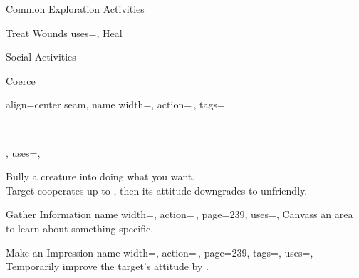 \begin{PageFront}
\begin{Tables}{\frontTableHeight}
\begin{Table}{Common Exploration Activities}
\begin{entry}{Treat Wounds}
{                uses=\Medicine,
            }
                Heal  \hfill
                 \hfill
                \\\hfill
                \Ts\DC[15] \quad
                \E\DC[20] \quad
                \M\DC[30]  \quad
                \Le\DC[40] \hfill
            \end{entry}
        \end{Table}
        \TableSpace
        \begin{Table}{Social Activities}
            \begin{entry}{Coerce}{%
                align=center seam,
                name width=\activityLength,%
                action=\,,
                tags=\parbox{0.5\linewidth}{\raggedleft{}\,\Concentrate\\\Auditory\Linguistic},
                uses=\InitimidationWill,
            }
                Bully a creature into doing what you want.\\
                Target cooperates up to , then its attitude downgrades to unfriendly. \hfill
                \\
                \hfill
            \end{entry}
            \begin{entry}{Gather Information}{%
                name width=\activityLength,%
                action=\,,
                page=239,
                uses={\Diplomacy[tags={S}]},
            }
                Canvass an area to learn about something specific.\hfill
            \end{entry}
            \begin{entry}{Make an Impression}{%
                name width=\activityLength,%
                action=\,,
                page=239,
                tags=\kern-0.5pt\Mental\Concentrate,
                uses=\DiplomacyWill,
            }
                Temporarily improve the target's attitude by .

\end{entry}
\end{Table}
\end{Tables}
\end{PageFront}
